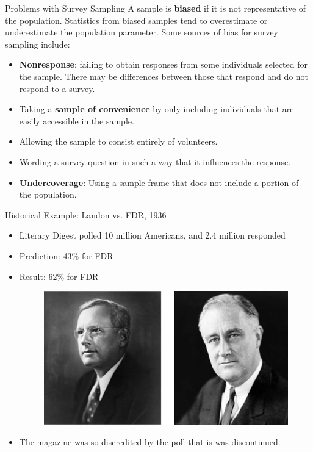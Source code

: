 \documentclass{beamer}
\begin{document}
\begin{frame}{Problems with Survey Sampling}
A sample is \textbf{biased} if it is not representative of the population.  Statistics from biased samples tend to overestimate or underestimate the population parameter.  Some sources of bias for survey sampling include:\\
\begin{itemize}
\item \textbf{Nonresponse}: failing to obtain responses from some individuals selected for the sample.  There may be differences between those that respond and do not respond to a survey.  
\item Taking a \textbf{sample of convenience} by only including individuals that are easily accessible in the sample.
\item Allowing the sample to consist entirely of volunteers.
\item Wording a survey question in such a way that it influences the response.
\item \textbf{Undercoverage}: Using a sample frame that does not include a portion of the population.
\end{itemize}
\end{frame}

\begin{frame}{Historical Example: Landon vs. FDR, 1936}
\begin{itemize}
\item Literary Digest polled 10 million Americans, and 2.4 million responded
\item Prediction: 43\% for FDR
\item Result: 62\% for FDR
\begin{figure}
\includegraphics[scale=0.2]{figure/landon-fdr.png}
\end{figure}
\item The magazine was so discredited by the poll that is was discontinued.
\end{itemize}
\end{frame}
\end{document}

